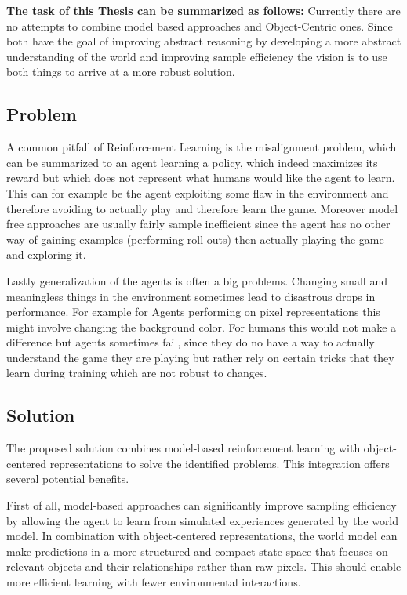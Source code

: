 \documentclass[
	english,
	ruledheaders=section,
	class=report,
	thesis={type=master},
	accentcolor=9c,
	custommargins=true,
	marginpar=false,
	parskip=half-,
	fontsize=11pt,
]{tudapub}
\begin{document}
\textbf{The task of this Thesis can be summarized as follows:}
Currently there are no attempts to combine model based approaches and Object-Centric ones. Since both have the goal of improving abstract reasoning by developing a more abstract understanding of the world and improving sample efficiency the vision is to use both things to arrive at a more robust solution.

\subsection{Problem}
\label{subsec:problem}

A common pitfall of Reinforcement Learning is the misalignment problem, which can be summarized to an agent learning a policy, which indeed maximizes its reward but which does not represent what humans would like the agent to learn. This can for example be the agent exploiting some flaw in the environment and therefore avoiding to actually play and therefore learn the game. Moreover model free approaches are usually fairly sample inefficient since the agent has no other way of gaining examples (performing roll outs) then actually playing the game and exploring it.

Lastly generalization of the agents is often a big problems. Changing small and meaningless things in the environment sometimes lead to disastrous drops in performance. For example for Agents performing on pixel representations this might involve changing the background color. For humans this would not make a difference but agents sometimes fail, since they do no have a way to actually understand the game they are playing but rather rely on certain tricks that they learn during training which are not robust to changes.

\subsection{Solution}
\label{subsec:solution}

The proposed solution combines model-based reinforcement learning with object-centered representations to solve the identified problems. This integration offers several potential benefits.

First of all, model-based approaches can significantly improve sampling efficiency by allowing the agent to learn from simulated experiences generated by the world model. In combination with object-centered representations, the world model can make predictions in a more structured and compact state space that focuses on relevant objects and their relationships rather than raw pixels. This should enable more efficient learning with fewer environmental interactions.
\end{document}
